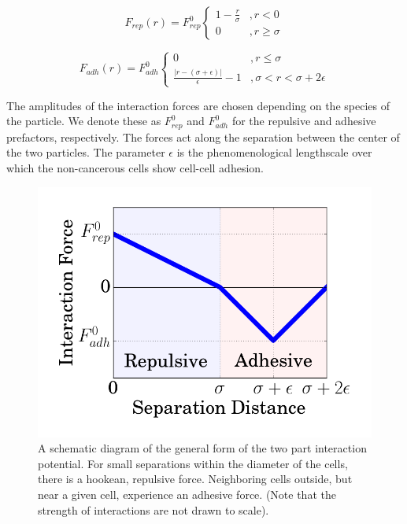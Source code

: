 \documentclass[aps,prb,twocolumn,groupedaddress,nofootinbib,floatfix]{revtex4}
\begin{document}
\begin{equation}
  F_{rep}(r) = F^0_{rep} \left\{ 
    \begin{array}{lr}
      1-\frac{r}{\sigma} &, r < 0\\
      0 &, r \ge \sigma
    \end{array}
  \right.
  \label{eq:frep}
\end{equation}

\begin{equation}
  F_{adh}(r) =F^0_{adh} \left\{
    \begin{array}{lr}
      0 &, r \le \sigma \\
      \frac{|r - (\sigma+\epsilon)|}{\epsilon}-1 &, \sigma < r < \sigma+2\epsilon
    \end{array}
  \right.
  \label{eq:fadh}
\end{equation}

The amplitudes of the interaction forces are chosen depending on the species of the particle. We denote these as $F^0_{rep}$ and $F^0_{adh}$ for the repulsive and adhesive prefactors, respectively.
The forces act along the separation between the center of the two particles. 
The parameter $\epsilon$ is the phenomenological lengthscale over which the non-cancerous cells show cell-cell adhesion. 

\begin{figure}
  \includegraphics[width=1.0\columnwidth]{interaction.png}
  \caption[capsuleECM]{A schematic diagram of the general form of the two part interaction potential. For small separations within the diameter of the cells, there is a hookean, repulsive force. Neighboring cells outside, but near a given cell, experience an adhesive force. (Note that the strength of interactions are not drawn to scale).}
   \label{fig:interaction}
\end{figure}
\end{document}
